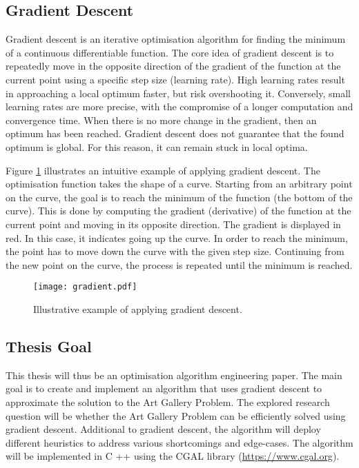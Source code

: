 \newpage
\subsection{Gradient Descent}

Gradient descent is an iterative optimisation algorithm for finding the minimum of a continuous differentiable function. The core idea of gradient descent is to repeatedly move in the opposite direction of the gradient of the function at the current point using a specific step size (learning rate). High learning rates result in approaching a local optimum faster, but risk overshooting it. Conversely, small learning rates are more precise, with the compromise of a longer computation and convergence time.
When there is no more change in the gradient, then an optimum has been reached. Gradient descent does not guarantee that the found optimum is global. For this reason, it can remain stuck in local optima.

Figure \ref{fig:gradient_descent} illustrates an intuitive example of applying gradient descent. The optimisation function takes the shape of a curve. Starting from an arbitrary point on the curve, the goal is to reach the minimum of the function (the bottom of the curve). This is done by computing the gradient (derivative) of the function at the current point and moving in its opposite direction. The gradient is displayed in red. In this case, it indicates going up the curve. In order to reach the minimum, the point has to move down the curve with the given step size. Continuing from the new point on the curve, the process is repeated until the minimum is reached.

\begin{figure}[h!]
    \centering
    \texttt{[image: gradient.pdf]}
    \caption{Illustrative example of applying gradient descent.}
    \label{fig:gradient_descent}
\end{figure}

\subsection{Thesis Goal}
This thesis will thus be an optimisation algorithm engineering paper. The main goal is to create and implement an algorithm that uses gradient descent to approximate the solution to the Art Gallery Problem. The explored research question will be whether the Art Gallery Problem can be efficiently solved using gradient descent. Additional to gradient descent, the algorithm will deploy different heuristics to address various shortcomings and edge-cases.
The algorithm will be implemented in C ++ using the CGAL library (\url{https://www.cgal.org}).

